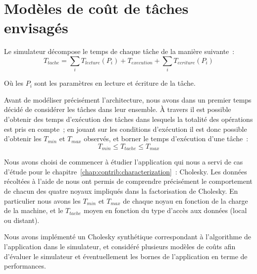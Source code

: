 \section{Modèles de coût de tâches envisagés}\label{sec:simulation:modeles}

Le simulateur décompose le temps de chaque tâche de la manière suivante~:
$$
T_{tache} = \sum_{i} T_{lecture}(P_i) + T_{execution} + \sum_{i} T_{ecriture}(P_i)
$$

Où les $P_i$ sont les paramètres en lecture et écriture de la tâche.

Avant de modéliser précisément l'architecture, nous avons dans un premier temps décidé de considérer les tâches dans leur ensemble.
À travers \outil il est possible d'obtenir des temps d'exécution des tâches dans lesquels la totalité des opérations est pris en compte~; en jouant sur les conditions d'exécution il est donc possible d'obtenir les $T_{min}$ et $T_{max}$ observés, et borner le temps d'exécution d'une tâche~:
$$
T_{min} \leq T_{tache} \leq T_{max}
$$


Nous avons choisi de commencer à étudier l'application qui nous a servi de cas d'étude pour le chapitre~\ref{chap:contrib:characterization}~: Cholesky.
Les données récoltées à l'aide de \outil nous ont permis de comprendre précisément le comportement de chacun des quatre noyaux impliqués dans la factorisation de Cholesky.
En particulier nous avons les $T_{min}$ et $T_{max}$ de chaque noyau en fonction de la charge de la machine, et le $T_{tache}$ moyen en fonction du type d'accès aux données (local ou distant).

Nous avons implémenté un Cholesky synthétique correspondant à l'algorithme de l'application dans le simulateur, et considéré plusieurs modèles de coûts afin d'évaluer le simulateur et éventuellement les bornes de l'application en terme de performances.

